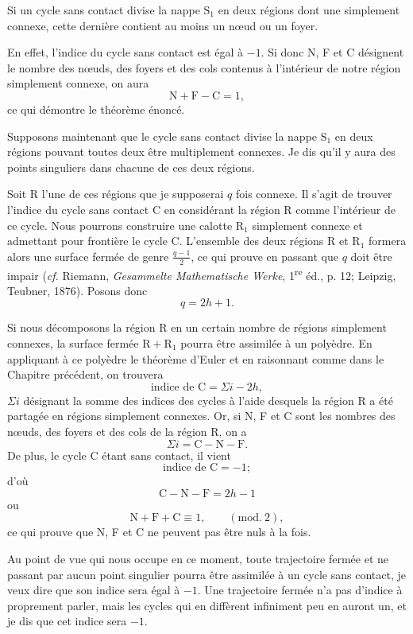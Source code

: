 \documentclass[11pt]{article}
\begin{document}
Si un cycle sans contact divise la nappe $\mathrm{S}_1$ en deux régions dont une simplement connexe, cette dernière contient au moins un nœud ou un foyer.

En effet, l’indice du cycle sans contact est égal à $-1$. Si donc N, F et C désignent le nombre des nœuds, des foyers et des cols contenus à l’intérieur de notre région simplement connexe, on aura
\[
\mathrm{N}+\mathrm{F}-\mathrm{C}=1,
\]
ce qui démontre le théorème énoncé.

Supposons maintenant que le cycle sans contact divise la nappe $\mathrm{S}_1$ en deux régions pouvant toutes deux être multiplement connexes. Je dis qu’il y aura des points singuliers dans chacune de ces deux régions.

Soit R l’une de ces régions que je supposerai $q$ fois connexe. Il s’agit de trouver l’indice du cycle sans contact C en considérant la région R comme l’intérieur de ce cycle. Nous pourrons construire une calotte $\mathrm{R}_1$ simplement connexe et admettant pour frontière le cycle C. L’ensemble des deux régions R et $\mathrm{R}_1$ formera alors une surface fermée de genre $\frac{q-1}{2}$, ce qui prouve en passant que $q$ doit être impair (\emph{cf.} Riemann, \emph{Gesammelte Mathematische Werke}, 1\textsuperscript{re} éd., p. 12; Leipzig, Teubner, 1876). Posons donc
\[
q=2h+1.
\]

Si nous décomposons la région R en un certain nombre de régions simplement connexes, la surface fermée $\mathrm{R}+\mathrm{R}_1$ pourra être assimilée à un polyèdre. En appliquant à ce polyèdre le théorème d’Euler et en raisonnant comme dans le Chapitre précédent, on trouvera
\[
\text{indice de }\mathrm{C}=\Sigma i-2h,
\]
$\Sigma i$ désignant la somme des indices des cycles à l’aide desquels la région R a été partagée en régions simplement connexes. Or, si N, F et C sont les nombres des nœuds, des foyers et des cols de la région R, on a
\[
\Sigma i=\mathrm{C}-\mathrm{N}-\mathrm{F}.
\]
De plus, le cycle C étant sans contact, il vient
\[
\text{indice de }\mathrm{C}=-1;
\]
d’où
\[
\mathrm{C}-\mathrm{N}-\mathrm{F}=2h-1
\]
ou
\[
\mathrm{N}+\mathrm{F}+\mathrm{C}\equiv 1,\qquad (\mathrm{mod}.\ 2),
\]
ce qui prouve que N, F et C ne peuvent pas être nuls à la fois.

Au point de vue qui nous occupe en ce moment, toute trajectoire fermée et ne passant par aucun point singulier pourra être assimilée à un cycle sans contact, je veux dire que son indice sera égal à $-1$. Une trajectoire fermée n’a pas d’indice à proprement parler, mais les cycles qui en diffèrent infiniment peu en auront un, et je dis que cet indice sera $-1$.
\end{document}
